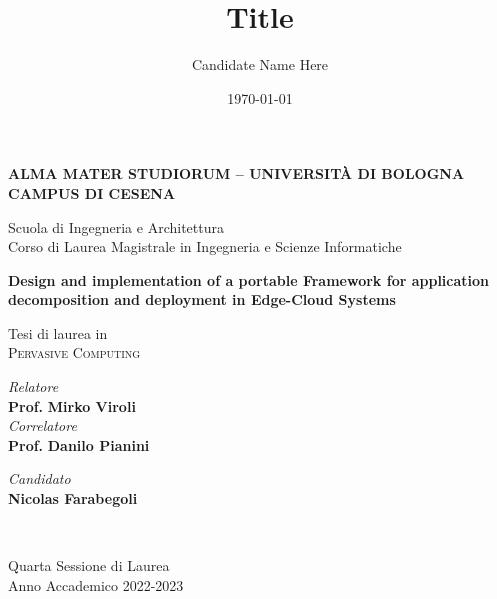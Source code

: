 \title{Title}
\author{Candidate Name Here}
\date{\today}

\begin{titlepage}
	\begin{center}

		\large
		\textbf{ALMA MATER STUDIORUM -- UNIVERSITÀ DI BOLOGNA \\ CAMPUS DI CESENA}
		\\
		\noindent\hrulefill
		\vspace{0.4cm}

		\Large
		Scuola di Ingegneria e Architettura \\
		Corso di Laurea Magistrale in Ingegneria e Scienze Informatiche

		\Huge
		\vspace{4cm}
		\textbf{
			Design and implementation of a portable Framework for application decomposition and deployment in Edge-Cloud Systems
		}

		\large
		\vspace{1cm}
		Tesi di laurea in
		\\
		\textsc{Pervasive Computing}

		\vspace{5.5cm}
		\begin{minipage}[t]{0.64\textwidth}
			\begin{flushleft}
				\textit{Relatore}
				\\
				\textbf{Prof.} \textbf{Mirko Viroli}
				\\
				\vspace{0.4cm}
				\textit{Correlatore}
				\\
				\textbf{Prof.} \textbf{Danilo Pianini}
			\end{flushleft}
		\end{minipage}
		\begin{minipage}[t]{0.34\textwidth}
			\begin{flushright}
				\textit{Candidato}
				\\
				\textbf{Nicolas Farabegoli}
			\end{flushright}
		\end{minipage}\\

		\vfill
		\noindent\hrulefill
		\vspace{0.3cm}
		\Large

		Quarta Sessione di Laurea
		\\
		Anno Accademico 2022-2023
	\end{center}
\end{titlepage}
\restoregeometry